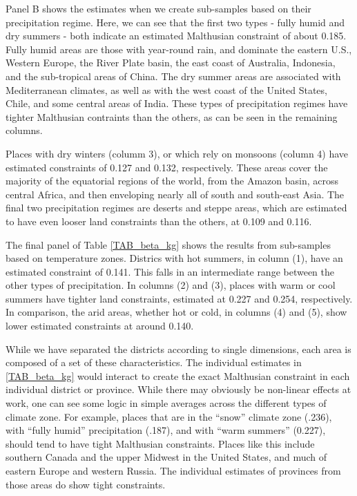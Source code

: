 \documentclass[11pt]{article}
\begin{document}
Panel B shows the estimates when we create sub-samples based on their precipitation regime. Here, we can see that the first two types - fully humid and dry summers - both indicate an estimated  Malthusian constraint of about 0.185. Fully humid areas are those with year-round rain, and dominate the eastern U.S., Western Europe, the River Plate basin, the east coast of Australia, Indonesia, and the sub-tropical areas of China. The dry summer areas are associated with Mediterranean climates, as well as with the west coast of the United States, Chile, and some central areas of India. These types of precipitation regimes have tighter Malthusian contraints than the others, as can be seen in the remaining columns.

Places with dry winters (columm 3), or which rely on monsoons (column 4) have estimated constraints of 0.127 and 0.132, respectively. These areas cover the majority of the equatorial regions of the world, from the Amazon basin, across central Africa, and then enveloping nearly all of south and south-east Asia. The final two precipitation regimes are deserts and steppe areas, which are estimated to have even looser land constraints than the others, at 0.109 and 0.116. 

The final panel of Table \ref{TAB_beta_kg} shows the results from sub-samples based on temperature zones. Districs with hot summers, in column (1), have an estimated constraint of 0.141. This falls in an intermediate range between the other types of precipitation. In columns (2) and (3), places with warm or cool summers have tighter land constraints, estimated at 0.227 and 0.254, respectively. In comparison, the arid areas, whether hot or cold, in columns (4) and (5), show lower estimated constraints at around 0.140. 

While we have separated the districts according to single dimensions, each area is composed of a set of these characteristics. The individual estimates in \ref{TAB_beta_kg} would interact to create the exact Malthusian constraint in each individual district or province. While there may obviously be non-linear effects at work, one can see some logic in simple averages across the different types of climate zone. For example, places that are in the ``snow'' climate zone (.236), with ``fully humid'' precipitation (.187), and with ``warm summers'' (0.227), should tend to have tight Malthusian constraints. Places like this include southern Canada and the upper Midwest in the United States, and much of eastern Europe and western Russia. The individual estimates of provinces from those areas do show tight constraints.
\end{document}
